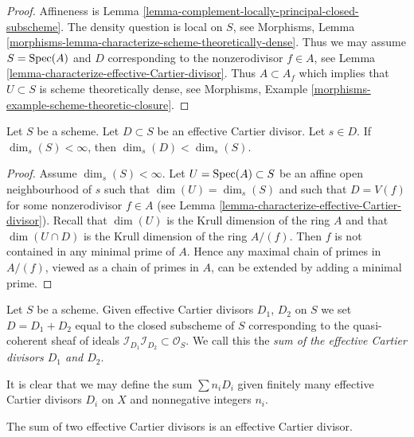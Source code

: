 \begin{proof}
Affineness is Lemma \ref{lemma-complement-locally-principal-closed-subscheme}.
The density question is local on $S$, see
Morphisms, Lemma \ref{morphisms-lemma-characterize-scheme-theoretically-dense}.
Thus we may assume $S = \mathop{\mathrm{Spec}}(A)$ and $D$ corresponding to the
nonzerodivisor $f \in A$, see
Lemma \ref{lemma-characterize-effective-Cartier-divisor}.
Thus $A \subset A_f$ which implies that $U \subset S$ is
scheme theoretically dense, see
Morphisms, Example \ref{morphisms-example-scheme-theoretic-closure}.
\end{proof}

\begin{lemma}
\label{lemma-effective-Cartier-makes-dimension-drop}
Let $S$ be a scheme.
Let $D \subset S$ be an effective Cartier divisor.
Let $s \in D$.
If $\dim_s(S) < \infty$, then $\dim_s(D) < \dim_s(S)$.
\end{lemma}

\begin{proof}
Assume $\dim_s(S) < \infty$.
Let $U = \mathop{\mathrm{Spec}}(A) \subset S$ be an affine open neighbourhood
of $s$ such that $\dim(U) = \dim_s(S)$ and such that $D = V(f)$
for some nonzerodivisor $f \in A$ (see
Lemma \ref{lemma-characterize-effective-Cartier-divisor}).
Recall that $\dim(U)$ is the Krull dimension of the ring $A$
and that $\dim(U \cap D)$ is the Krull dimension of the ring $A/(f)$.
Then $f$ is not contained in any minimal prime of $A$.
Hence any maximal chain of primes in $A/(f)$, viewed as a chain
of primes in $A$, can be extended by adding a minimal prime.
\end{proof}

\begin{definition}
\label{definition-sum-effective-Cartier-divisors}
Let $S$ be a scheme. Given effective Cartier divisors
$D_1$, $D_2$ on $S$ we set $D = D_1 + D_2$ equal to the
closed subscheme of $S$ corresponding to the quasi-coherent
sheaf of ideals
$\mathcal{I}_{D_1}\mathcal{I}_{D_2} \subset \mathcal{O}_S$.
We call this the {\it sum of the effective Cartier divisors
$D_1$ and $D_2$}.
\end{definition}

\noindent
It is clear that we may define the sum $\sum n_iD_i$ given
finitely many effective Cartier divisors $D_i$ on $X$
and nonnegative integers $n_i$.

\begin{lemma}
\label{lemma-sum-effective-Cartier-divisors}
The sum of two effective Cartier divisors is an effective
Cartier divisor.
\end{lemma}

